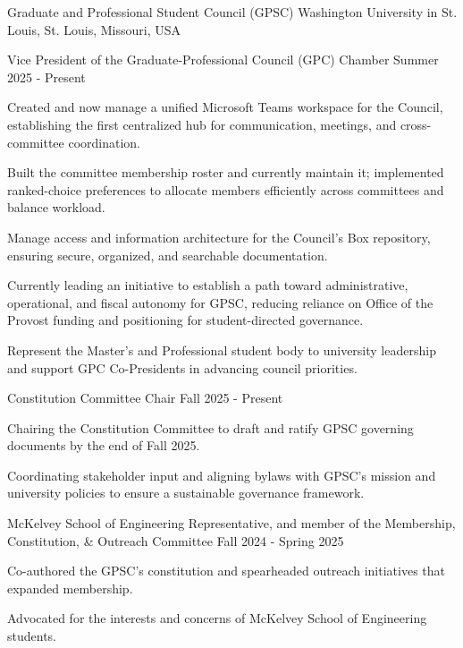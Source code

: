 \documentclass[10pt, letterpaper]{article}
\begin{document}
\begin{leadershipentry}
  {Graduate and Professional Student Council (GPSC)} %
  {Washington University in St. Louis, St. Louis, Missouri, USA} %
  \begin{positionentry}
    {Vice President of the Graduate-Professional Council (GPC) Chamber} %
    {Summer 2025 - Present} %
    \item Created and now manage a unified Microsoft Teams workspace for the Council, establishing the first centralized hub for communication, meetings, and cross-committee coordination.
    \item Built the committee membership roster and currently maintain it; implemented ranked-choice preferences to allocate members efficiently across committees and balance workload.
    \item Manage access and information architecture for the Council's Box repository, ensuring secure, organized, and searchable documentation.
    \item Currently leading an initiative to establish a path toward administrative, operational, and fiscal autonomy for GPSC, reducing reliance on Office of the Provost funding and positioning for student-directed governance.
    \item Represent the Master's and Professional student body to university leadership and support GPC Co-Presidents in advancing council priorities.
  \end{positionentry}
  \begin{positionentry}
    {Constitution Committee Chair} %
    {Fall 2025 - Present} %
    \item Chairing the Constitution Committee to draft and ratify GPSC governing documents by the end of Fall 2025.
    \item Coordinating stakeholder input and aligning bylaws with GPSC's mission and university policies to ensure a sustainable governance framework.
  \end{positionentry}
  \begin{positionentry}
    {McKelvey School of Engineering Representative, and member of the Membership, Constitution, \& Outreach Committee} %
    {Fall 2024 - Spring 2025} %
    \item Co-authored the GPSC's constitution and spearheaded outreach initiatives that expanded membership.
    \item Advocated for the interests and concerns of McKelvey School of Engineering students.
  \end{positionentry}
\end{leadershipentry}
\end{document}
